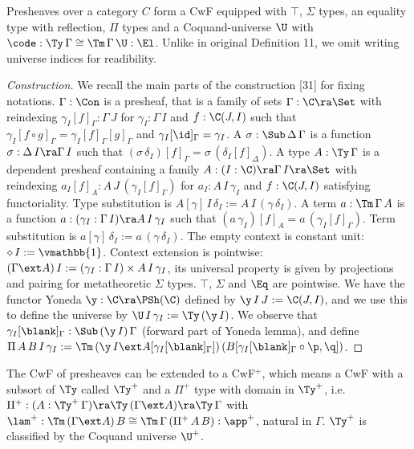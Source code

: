 \begin{problem}[$\PSh$]\label{prob:presheaf}
  Presheaves over a category $C$ form a CwF equipped with $\top$, $\Sigma$ types,
  an equality type with reflection, $\Pi$ types and a Coquand-universe
  $\U$ with $\code:\Ty\,\Gamma\cong\Tm\,\Gamma\,\U:\El$. Unlike in
  original Definition 11, we omit writing universe indices for
  readibility.
\end{problem}
\begin{proof}[Construction]
  We recall the main parts of the construction
  [31] for fixing notations.  $\Gamma:\Con$ is a
  presheaf, that is a family of sets $\Gamma:\C\ra\Set$ with
  reindexing $\gamma_I[f]_\Gamma : \Gamma\,J$ for $\gamma_I:\Gamma\,I$
  and $f:\C(J,I)$ such that $\gamma_I[f\circ g]_\Gamma =
  \gamma_I[f]_\Gamma[g]_\Gamma$ and $\gamma_I[\id]_\Gamma =
  \gamma_I$. A $\sigma:\Sub\,\Delta\,\Gamma$ is a function $\sigma :
  \Delta\,I\ra\Gamma\,I$ such that $(\sigma\,\delta_I)[f]_\Gamma =
  \sigma\,(\delta_I[f]_\Delta)$. A type $A:\Ty\,\Gamma$ is a dependent
  presheaf containing a family $A : (I:\C)\ra\Gamma\,I\ra\Set$ with
  reindexing $a_I[f]_A : A\,J\,(\gamma_I[f]_\Gamma)$ for
  $a_I:A\,I\,\gamma_I$ and $f:\C(J,I)$ satisfying functoriality. Type
  substitution is $A[\gamma]\,I\,\delta_I :=
  A\,I\,(\gamma\,\delta_I)$. A term $a:\Tm\,\Gamma\,A$ is a function
  $a : (\gamma_I:\Gamma\,I)\ra A\,I\,\gamma_I$ such that
  $(a\,\gamma_I)[f]_A = a\,(\gamma_I[f]_\Gamma)$. Term substitution is
  $a[\gamma]\,\delta_I := a\,(\gamma\,\delta_I)$. The empty context is
  constant unit: $\diamond\,I := \vmathbb{1}$. Context extension is
  pointwise: $(\Gamma\ext A)\,I := (\gamma_I:\Gamma\,I)\times
  A\,I\,\gamma_I$, its universal property is given by projections and
  pairing for metatheoretic $\Sigma$ types. $\top$, $\Sigma$ and $\Eq$
  are pointwise. We have the functor Yoneda $\y : \C\ra\PSh(\C)$
  defined by $\y\,I\,J := \C(J,I)$, and we use this to define the
  universe by $\U\,I\,\gamma_I := \Ty\,(\y\,I)$. We observe that
  $\gamma_I[\blank]_\Gamma : \Sub\,(\y\,I)\,\Gamma$ (forward part of
  Yoneda lemma), and define $\Pi\,A\,B\,I\,\gamma_I := \Tm\,(\y\,I\ext
  A[\gamma_I[\blank]_\Gamma])\,(B[\gamma_I[\blank]_\Gamma\circ\p,\q])$.
\end{proof}
\begin{problem}
  The CwF of presheaves can be extended to a CwF$^+$, which means a
  CwF with a subsort of $\Ty$ called $\Ty^+$ and a $\Pi^+$ type with
  domain in $\Ty^+$, i.e.\ $\Pi^+ :
  (A:\Ty^+\,\Gamma)\ra\Ty\,(\Gamma\ext A)\ra\Ty\,\Gamma$ with $\lam^+
  : \Tm\,(\Gamma\ext A)\,B\cong\Tm\,\Gamma\,(\Pi^+\,A\,B) : \app^+$,
  natural in $\Gamma$. $\Ty^+$ is classified by the Coquand universe
  $\U^+$.
\end{problem}
